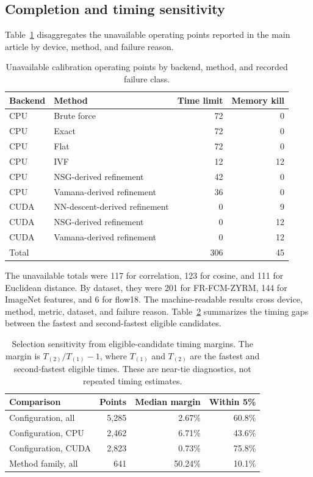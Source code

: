 \documentclass[11pt]{article}
\begin{document}
\subsection{Completion and timing sensitivity}

Table~\ref{tab:calibration-missing} disaggregates the unavailable operating
points reported in the main article by device, method, and failure reason.

\begin{table}[h]
\centering

\begin{tabular}{@{}llrr@{}}
\toprule
Backend & Method & Time limit & Memory kill \\
\midrule
CPU & Brute force & 72 & 0 \\
CPU & Exact & 72 & 0 \\
CPU & Flat & 72 & 0 \\
CPU & IVF & 12 & 12 \\
CPU & NSG-derived refinement & 42 & 0 \\
CPU & Vamana-derived refinement & 36 & 0 \\
CUDA & NN-descent-derived refinement & 0 & 9 \\
CUDA & NSG-derived refinement & 0 & 12 \\
CUDA & Vamana-derived refinement & 0 & 12 \\
\midrule
Total & & 306 & 45 \\
\bottomrule
\end{tabular}
\caption{Unavailable calibration operating points by backend, method, and
recorded failure class.}
\label{tab:calibration-missing}
\end{table}

The unavailable totals were 117 for correlation, 123 for cosine, and 111 for
Euclidean distance. By dataset, they were 201 for FR-FCM-ZYRM, 144 for ImageNet
features, and 6 for flow18. The machine-readable results cross device,
method, metric, dataset, and failure reason.
Table~\ref{tab:calibration-stability} summarizes the timing gaps between
the fastest and second-fastest eligible candidates.

\begin{table}[h]
\centering

\begin{tabular}{@{}lrrr@{}}
\toprule
Comparison & Points & Median margin & Within 5\% \\
\midrule
Configuration, all & 5,285 & 2.67\% & 60.8\% \\
Configuration, CPU & 2,462 & 6.71\% & 43.6\% \\
Configuration, CUDA & 2,823 & 0.73\% & 75.8\% \\
Method family, all & 641 & 50.24\% & 10.1\% \\
\bottomrule
\end{tabular}
\caption{Selection sensitivity from eligible-candidate timing margins. The
margin is $T_{(2)}/T_{(1)}-1$, where $T_{(1)}$ and $T_{(2)}$ are the fastest and
second-fastest eligible times. These are near-tie diagnostics, not repeated
timing estimates.}
\label{tab:calibration-stability}
\end{table}
\end{document}
